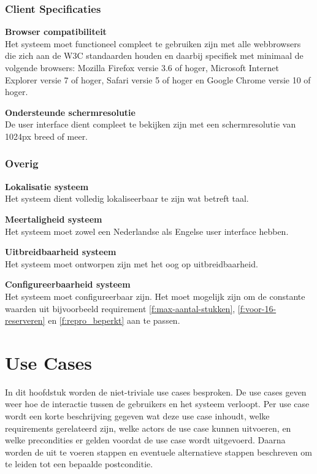 \documentclass[a4paper,titlepage]{report}
\makeatletter
\def\nameddisplayedlabel#1#2{
  \label{#1}
  \begingroup
   \def\@currentlabel{#2}%
   \label{#1:name}\endgroup
   \textbf{#2}\hfill\\
}
\makeatother
\begin{document}
    \subsection{Client Specificaties}
      \begin{enumerate}[label={[NF:\arabic*]},resume]
        \item\nameddisplayedlabel{nf:browser_compat}{Browser compatibiliteit}
          Het systeem moet functioneel compleet te gebruiken zijn met alle
          webbrowsers die zich aan de W3C standaarden houden en daarbij
          specifiek met minimaal de volgende browsers: Mozilla Firefox versie
          3.6 of hoger, Microsoft Internet Explorer versie 7 of hoger, Safari
          versie 5 of hoger en Google Chrome versie 10 of hoger.
        \item\nameddisplayedlabel{nf:resolutie}{Ondersteunde schermresolutie}
          De user interface dient compleet te bekijken zijn met een
          schermresolutie van 1024px breed of meer.
      \end{enumerate}
    \subsection{Overig}
      \begin{enumerate}[label={[NF:\arabic*]},resume]
        \item\nameddisplayedlabel{nf:lokalisatie}{Lokalisatie systeem}
          Het systeem dient volledig lokaliseerbaar te zijn wat betreft taal.
        \item\nameddisplayedlabel{nf:meertalig}{Meertaligheid systeem}
          Het systeem moet zowel een Nederlandse als Engelse user interface
          hebben.
        \item\nameddisplayedlabel{nf:uitbreidbaar}{Uitbreidbaarheid systeem}
          Het systeem moet ontworpen zijn met het oog op uitbreidbaarheid.
        \item\nameddisplayedlabel{nf:configureerbaar}{Configureerbaarheid systeem}
          Het systeem moet configureerbaar zijn. Het moet mogelijk
          zijn om de constante waarden uit bijvoorbeeld requirement
          \ref{f:max-aantal-stukken}, \ref{f:voor-16-reserveren} en
          \ref{f:repro_beperkt} aan te passen.
      \end{enumerate}

\chapter{Use Cases}
\label{chap:use_cases}
In dit hoofdstuk worden de niet-triviale use cases besproken. De use cases
geven weer hoe de interactie tussen de gebruikers en het systeem
verloopt. Per use case wordt een korte beschrijving gegeven wat deze use case
inhoudt, welke requirements gerelateerd zijn, welke actors de use case kunnen
uitvoeren, en welke precondities er gelden voordat de use case wordt
uitgevoerd. Daarna worden de uit te voeren stappen en eventuele alternatieve
stappen beschreven om te leiden tot een bepaalde postconditie.
\end{document}
